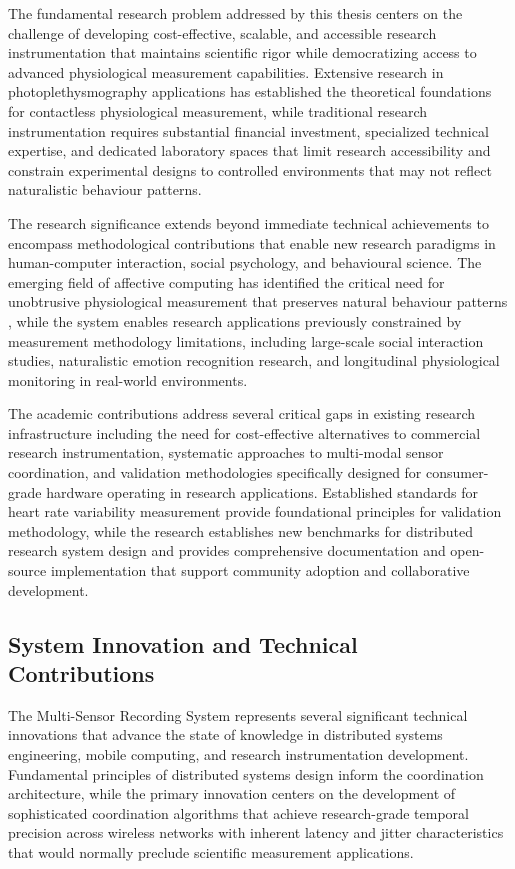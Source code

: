 \documentclass[11pt,a4paper]{report}
\begin{document}
The fundamental research problem addressed by this thesis centers on the challenge of developing cost-effective, scalable, and accessible research instrumentation that maintains scientific rigor while democratizing access to advanced physiological measurement capabilities. Extensive research in photoplethysmography applications has established the theoretical foundations for contactless physiological measurement, while traditional research instrumentation requires substantial financial investment, specialized technical expertise, and dedicated laboratory spaces that limit research accessibility and constrain experimental designs to controlled environments that may not reflect naturalistic behaviour patterns.

The research significance extends beyond immediate technical achievements to encompass methodological contributions that enable new research paradigms in human-computer interaction, social psychology, and behavioural science. The emerging field of affective computing has identified the critical need for unobtrusive physiological measurement that preserves natural behaviour patterns \cite{cho2020stress}, while the system enables research applications previously constrained by measurement methodology limitations, including large-scale social interaction studies, naturalistic emotion recognition research, and longitudinal physiological monitoring in real-world environments.

The academic contributions address several critical gaps in existing research infrastructure including the need for cost-effective alternatives to commercial research instrumentation, systematic approaches to multi-modal sensor coordination, and validation methodologies specifically designed for consumer-grade hardware operating in research applications. Established standards for heart rate variability measurement provide foundational principles for validation methodology, while the research establishes new benchmarks for distributed research system design and provides comprehensive documentation and open-source implementation that support community adoption and collaborative development.

\subsection{System Innovation and Technical Contributions}

The Multi-Sensor Recording System represents several significant technical innovations that advance the state of knowledge in distributed systems engineering, mobile computing, and research instrumentation development. Fundamental principles of distributed systems design inform the coordination architecture, while the primary innovation centers on the development of sophisticated coordination algorithms that achieve research-grade temporal precision across wireless networks with inherent latency and jitter characteristics that would normally preclude scientific measurement applications.
\end{document}
